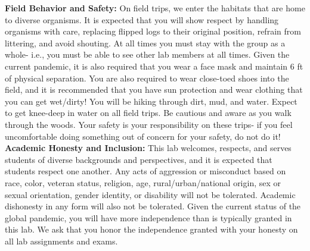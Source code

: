 \documentclass[11pt, a4paper]{article}
\begin{document}
\noindent\textbf{Field Behavior and Safety:}
On field trips, we enter the habitats that are home to diverse organisms. It is expected that you will show respect by handling organisms with care, replacing flipped logs to their original position, refrain from littering, and avoid shouting. At all times you must stay with the group as a whole- i.e., you must be able to see other lab members at all times. Given the current pandemic, it is also required that you wear a face mask and maintain 6 ft of physical separation. You are also required to wear close-toed shoes into the field, and it is recommended that you have sun protection and wear clothing that you can get wet/dirty! You will be hiking through dirt, mud, and water. Expect to get knee-deep in water on all field trips. Be cautious and aware as you walk through the woods. Your safety is your responsibility on these trips- if you feel uncomfortable doing something out of concern for your safety, do not do it!\\

\noindent\textbf{Academic Honesty and Inclusion:}
This lab welcomes, respects, and serves students of diverse backgrounds and perspectives, and it is expected that students respect one another. Any acts of aggression or misconduct based on race, color, veteran status, religion, age, rural/urban/national origin, sex or sexual orientation, gender identity, or disability will not be tolerated. Academic dishonesty in any form will also not be tolerated. Given the current status of the global pandemic, you will have more independence than is typically granted in this lab. We ask that you honor the independence granted with your honesty on all lab assignments and exams.
\end{document}
